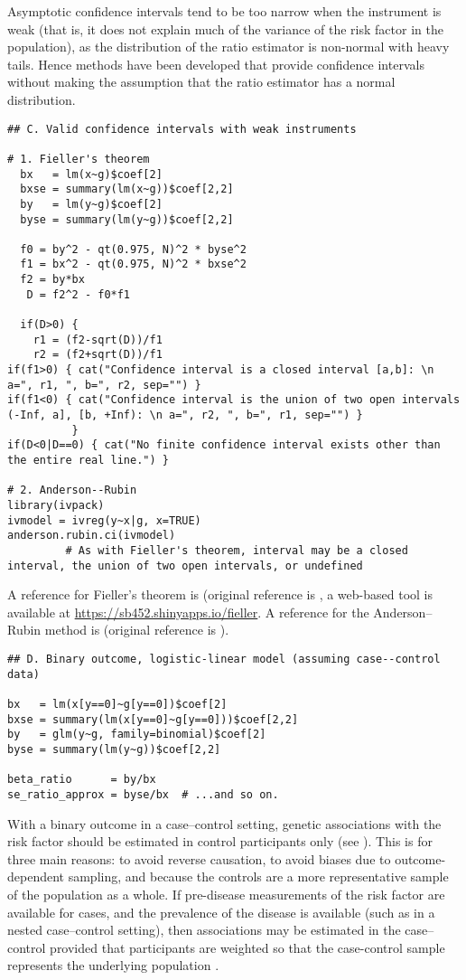 \documentclass[a4paper,12pt]{article} %
\begin{document}
Asymptotic confidence intervals tend to be too narrow when the instrument is weak (that is, it does not explain much of the variance of the risk factor in the population), as the distribution of the ratio estimator is non-normal with heavy tails. Hence methods have been developed that provide confidence intervals without making the assumption that the ratio estimator has a normal distribution.

\begin{lstlisting}
## C. Valid confidence intervals with weak instruments

# 1. Fieller's theorem
  bx   = lm(x~g)$coef[2]
  bxse = summary(lm(x~g))$coef[2,2]
  by   = lm(y~g)$coef[2]
  byse = summary(lm(y~g))$coef[2,2]

  f0 = by^2 - qt(0.975, N)^2 * byse^2
  f1 = bx^2 - qt(0.975, N)^2 * bxse^2
  f2 = by*bx
   D = f2^2 - f0*f1

  if(D>0) {
    r1 = (f2-sqrt(D))/f1
    r2 = (f2+sqrt(D))/f1
if(f1>0) { cat("Confidence interval is a closed interval [a,b]: \n a=", r1, ", b=", r2, sep="") }
if(f1<0) { cat("Confidence interval is the union of two open intervals (-Inf, a], [b, +Inf): \n a=", r2, ", b=", r1, sep="") }
          }
if(D<0|D==0) { cat("No finite confidence interval exists other than the entire real line.") }

# 2. Anderson--Rubin
library(ivpack)
ivmodel = ivreg(y~x|g, x=TRUE)
anderson.rubin.ci(ivmodel)
         # As with Fieller's theorem, interval may be a closed interval, the union of two open intervals, or undefined
\end{lstlisting}

A reference for Fieller's theorem is \cite{buonaccorsi2005} (original reference is \cite{fieller1954}, a web-based tool is available at \url{https://sb452.shinyapps.io/fieller}. A reference for the Anderson--Rubin method is \cite{mikusheva2010} (original reference is \cite{anderson1949}).

\begin{lstlisting}
## D. Binary outcome, logistic-linear model (assuming case--control data)

bx   = lm(x[y==0]~g[y==0])$coef[2]
bxse = summary(lm(x[y==0]~g[y==0]))$coef[2,2]
by   = glm(y~g, family=binomial)$coef[2]
byse = summary(lm(y~g))$coef[2,2]

beta_ratio      = by/bx
se_ratio_approx = byse/bx  # ...and so on.
\end{lstlisting}

With a binary outcome in a case--control setting, genetic associations with the risk factor should be estimated in control participants only (see \cite{didelez2007}). This is for three main reasons: to avoid reverse causation, to avoid biases due to outcome-dependent sampling, and because the controls are a more representative sample of the population as a whole. If pre-disease measurements of the risk factor are available for cases, and the prevalence of the disease is available (such as in a nested case--control setting), then associations may be estimated in the case--control provided that participants are weighted so that the case-control sample represents the underlying population \citep{bowden2011}.
\end{document}
